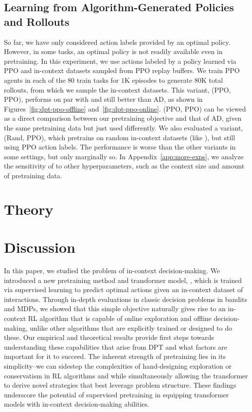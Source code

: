 \documentclass{article}
\begin{document}
\subsection{Learning from Algorithm-Generated Policies and Rollouts}
\label{subsec:mdp_ppo_data}

So far, we have only considered action labels provided by an optimal policy. However, in some tasks, an optimal policy is not readily available even in pretraining. In this experiment, we use actions labeled by a policy learned via PPO and in-context datasets sampled from PPO replay buffers. We train PPO agents in each of the $80$ train tasks for $1$K episodes to generate $80$K total rollouts, from which we sample the in-context datasets. This variant, \macroName{} (PPO, PPO), performs on par with \macroName{} and still better than AD, as shown in Figures~\ref{fig:dpt-ppo-offline} and~\ref{fig:dpt-ppo-online}. \macroName{} (PPO, PPO) can be viewed as a direct comparison between our pretraining objective and that of AD, given the same pretraining data but just used differently. We also evaluated a variant, \macroName{} (Rand, PPO), which pretrains on random in-context datasets (like \macroName{}), but still using PPO action labels. The performance is worse than the other \macroName{} variants in some settings, but only marginally so. In Appendix~\ref{app:more-exps}, we analyze the sensitivity of \macroName{} to other hyperparameters, such as the context size and amount of pretraining data.


 

\section{Theory}\label{sec:theory}





\section{Discussion}


In this paper, we studied the problem of in-context decision-making. We introduced a new pretraining method and transformer model,  \macroName{}, which is trained via supervised learning to predict optimal actions given an in-context dataset of interactions. Through in-depth evaluations in classic decision problems in bandits and MDPs, we showed that this simple objective naturally gives rise to an in-context RL algorithm that is capable of online exploration and offline decision-making, unlike other algorithms that are explicitly trained or designed to do these. Our empirical and theoretical results provide first steps towards understanding these capabilities that arise from DPT and what factors are important for it to succeed. 
The inherent strength of pretraining lies in its simplicity--we can sidestep the complexities of hand-designing exploration or conservatism in RL algorithms and while simultaneously allowing the transformer to derive novel strategies that best leverage problem structure. 
These findings underscore the potential of supervised pretraining in equipping transformer models with in-context decision-making abilities. 
\end{document}
